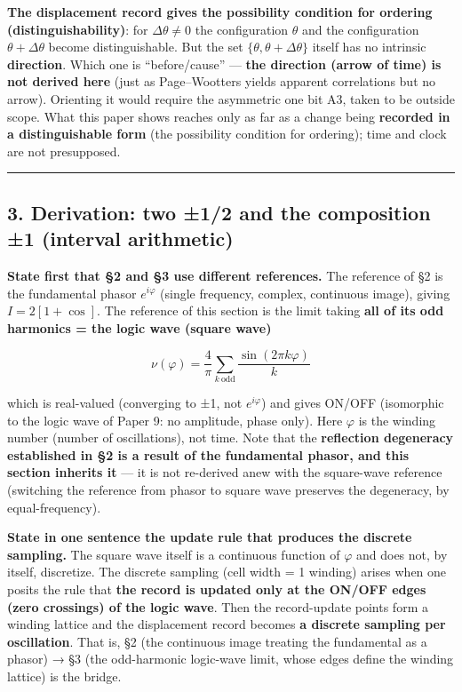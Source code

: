 \documentclass[
]{ltjsarticle}
\begin{document}
\textbf{The displacement record gives the possibility condition for
ordering (distinguishability)}: for \(\Delta\theta\neq0\) the
configuration \(\theta\) and the configuration \(\theta+\Delta\theta\)
become distinguishable. But the set \(\{\theta,\theta+\Delta\theta\}\)
itself has no intrinsic \textbf{direction}. Which one is
``before/cause'' --- \textbf{the direction (arrow of time) is not
derived here} (just as Page--Wootters yields apparent correlations but
no arrow). Orienting it would require the asymmetric one bit A3, taken
to be outside scope. What this paper shows reaches only as far as a
change being \textbf{recorded in a distinguishable form} (the
possibility condition for ordering); time and clock are not presupposed.

\begin{center}\rule{0.5\linewidth}{0.5pt}\end{center}

\subsection{3. Derivation: two ±1/2 and the composition ±1 (interval
arithmetic)}\label{derivation-two-12-and-the-composition-1-interval-arithmetic}

\textbf{State first that §2 and §3 use different references.} The
reference of §2 is the fundamental phasor \(e^{i\varphi}\) (single
frequency, complex, continuous image), giving \(I=2[1+\cos]\). The
reference of this section is the limit taking \textbf{all of its odd
harmonics = the logic wave (square wave)}

\[
\nu(\varphi)=\frac{4}{\pi}\sum_{k\ \text{odd}}\frac{\sin(2\pi k \varphi)}{k}
\]

which is real-valued (converging to ±1, not \(e^{i\varphi}\)) and gives
ON/OFF (isomorphic to the logic wave of Paper 9: no amplitude, phase
only). Here \(\varphi\) is the winding number (number of oscillations),
not time. Note that the \textbf{reflection degeneracy established in §2
is a result of the fundamental phasor, and this section inherits it} ---
it is not re-derived anew with the square-wave reference (switching the
reference from phasor to square wave preserves the degeneracy, by
equal-frequency).

\textbf{State in one sentence the update rule that produces the discrete
sampling.} The square wave itself is a continuous function of
\(\varphi\) and does not, by itself, discretize. The discrete sampling
(cell width = 1 winding) arises when one posits the rule that
\textbf{the record is updated only at the ON/OFF edges (zero crossings)
of the logic wave}. Then the record-update points form a winding lattice
and the displacement record becomes \textbf{a discrete sampling per
oscillation}. That is, §2 (the continuous image treating the fundamental
as a phasor) → §3 (the odd-harmonic logic-wave limit, whose edges define
the winding lattice) is the bridge.
\end{document}

